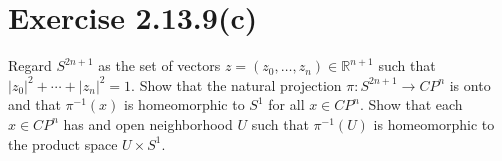 \documentclass[12pt]{article}
\newenvironment{problem}
    {\begin{lrbox}{\mybox}\begin{minipage}{\textwidth-10pt}}
    {\end{minipage}\end{lrbox}\framebox[6.5in]{\usebox{\mybox}}}
\newcommand{\R}{\mathbb{R}}
\begin{document}
\section*{Exercise 2.13.9(c)}
\begin{problem}
    Regard $S^{2n+1}$ as the set of vectors $z = (z_0,\dots,z_n)\in\R^{n+1}$ such that $|z_0|^2 + \cdots + |z_n|^2 = 1$. Show that the natural projection $\pi:S^{2n+1}\to CP^n$ is onto and that $\pi^{-1}(x)$ is homeomorphic to $S^1$ for all $x\in CP^n$. Show that each $x\in CP^n$ has and open neighborhood $U$ such that $\pi^{-1}(U)$ is homeomorphic to the product space $U\times S^1$.
\end{problem}
\end{document}
